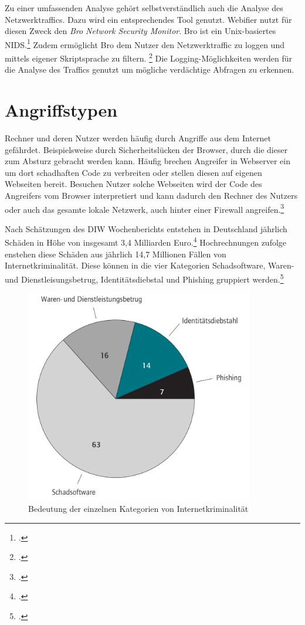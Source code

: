 Zu einer umfassenden Analyse gehört selbstverständlich auch die Analyse des Netzwerktraffics. Dazu wird ein entsprechendes Tool genutzt. Webifier nutzt für diesen Zweck den \textit{Bro Network Security Monitor}. Bro ist ein Unix-basiertes \ac{NIDS}.\footcite[Vgl.][199]{bro} Zudem ermöglicht Bro dem Nutzer den Netzwerktraffic zu loggen und mittels eigener Skriptsprache zu filtern. \footcite[Vgl.][]{bro2} Die Logging-Möglichkeiten werden für die Analyse des Traffics genutzt um mögliche verdächtige Abfragen zu erkennen.


\section{Angriffstypen}

Rechner und deren Nutzer werden häufig durch Angriffe aus dem Internet gefährdet. Beispielsweise durch Sicherheitslücken der Browser, durch die dieser zum Absturz gebracht werden kann. Häufig brechen Angreifer in Webserver ein um dort schadhaften Code zu verbreiten oder stellen diesen auf eigenen Webseiten bereit. Besuchen Nutzer solche Webseiten wird der Code des Angreifers vom Browser interpretiert und kann dadurch den Rechner des Nutzers oder auch das gesamte lokale Netzwerk, auch hinter einer Firewall angreifen.\footcite[Vgl.][1\psqq]{clientSideAttacks}

Nach Schätzungen des DIW Wochenberichts entstehen in Deutschland jährlich Schäden in Höhe von insgesamt 3,4 Milliarden Euro.\footcite[Vgl.][301]{cybercrime} Hochrechnungen zufolge enstehen diese Schäden aus jährlich 14,7 Millionen Fällen von Internetkriminalität. Diese können in die vier Kategorien Schadsoftware, Waren- und Dienstleisungsbetrug, Identitätsdiebstal und Phishing gruppiert werden.\footcite[Vgl.][297]{cybercrime}

\begin{figure}[H]
  \centering
  \includegraphics[width=10cm]{images/kategorien-cybercrime}
  \caption[Bedeutung der einzelnen Kategorien von Internetkriminalität]{Bedeutung der einzelnen Kategorien von Internetkriminalität\protect\footnotemark}
  \label{fig:categories-cybercrime}
\end{figure}

